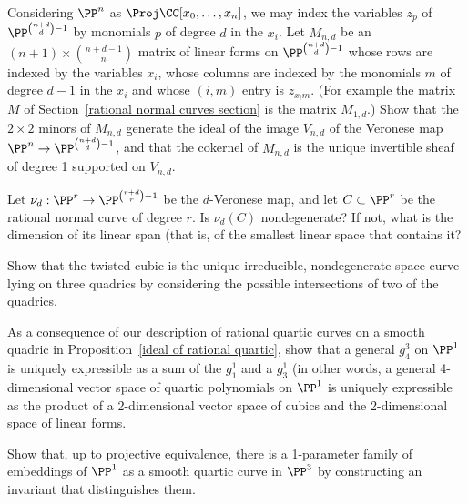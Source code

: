 \begin{exercise}\label{equations of Veroneses}
Considering $\PP^n$ as $\Proj \CC[x_0,\dots,x_n]$, we may index the variables $z_p$ of $\PP^{\binom{n+d}{d}-1}$ by  monomials $p$
of degree $d$ in the $x_i$. Let $M_{n,d}$ be an $(n+1)\times \binom{n+d-1}{n}$ matrix of linear forms
on $\PP^{\binom{n+d}{d}-1}$ whose rows are indexed by the variables $x_i$, whose columns are indexed by the monomials $m$ of degree $d-1$ in the $x_i$ and
whose $(i,m)$ entry is $z_{x_im}$. (For example the matrix
$M$ of Section~\ref{rational normal curves section} is the matrix $M_{1,d}$.) Show that the $2\times 2$ minors of $M_{n,d}$ generate the ideal of the image $V_{n,d}$ of the Veronese map 
$\PP^n\to \PP^{\binom{n+d}{d}-1}$, and that the cokernel of $M_{n,d}$ is the unique invertible sheaf of degree 1 supported on $V_{n,d}$.
\end{exercise}

\begin{exercise}
 Let $\nu_d: \PP^r \to \PP^{\binom{r+d}{r}-1}$ be the $d$-Veronese map, and let $C\subset \PP^r$ be the rational normal curve of degree $r$. Is $\nu_d(C)$ nondegenerate? If not, what is the dimension of its linear span (that is, of the smallest linear
 space that contains it?
\end{exercise}


\begin{exercise}
Show that the twisted cubic is the unique irreducible, nondegenerate space curve lying on three quadrics by considering the possible
intersections of two of the quadrics.
\end{exercise}

\begin{exercise}\label{decomposition of a $g^3_4$}
As a consequence of our description of rational quartic curves on a smooth quadric in Proposition~\ref{ideal of rational quartic},
show that a general $g^3_4$ on $\PP^1$ is uniquely expressible as a sum of the $g_1^1$ and a $g^1_3$
(in other words, a general 4-dimensional vector space of quartic polynomials on $\PP^1$ is uniquely expressible as the product of a 2-dimensional vector space of cubics and the 2-dimensional space of linear forms.
\end{exercise}

\begin{exercise}\label{distinguishing rational quartics}
Show that, up to projective equivalence, there is a 1-parameter family of embeddings of $\PP^1$ as a 
smooth quartic curve in $\PP^3$ 
by constructing an invariant that distinguishes them. 
\end{exercise}

